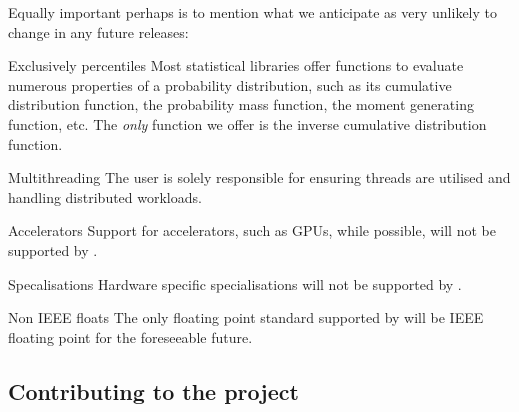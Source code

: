 Equally important perhaps is to mention what we anticipate as very unlikely to change in any future releases:
\begin{longdescription}
\item[Exclusively percentiles] Most statistical libraries offer functions to evaluate numerous properties of a probability distribution, such as its cumulative distribution function, the probability mass function, the moment generating function, etc. The \textit{only} function we offer is the inverse cumulative distribution function.
\item[Multithreading] The user is solely responsible for ensuring threads are utilised and handling distributed workloads.  
\item[Accelerators] Support for accelerators, such as GPUs, while possible, will not be supported by \arv.
\item[Specalisations] Hardware specific specialisations will not be supported by \arv.
\item[Non IEEE floats] The only floating point standard supported by \arv will be IEEE floating point for the foreseeable future. 
\end{longdescription}


\subsection{Contributing to the project}

